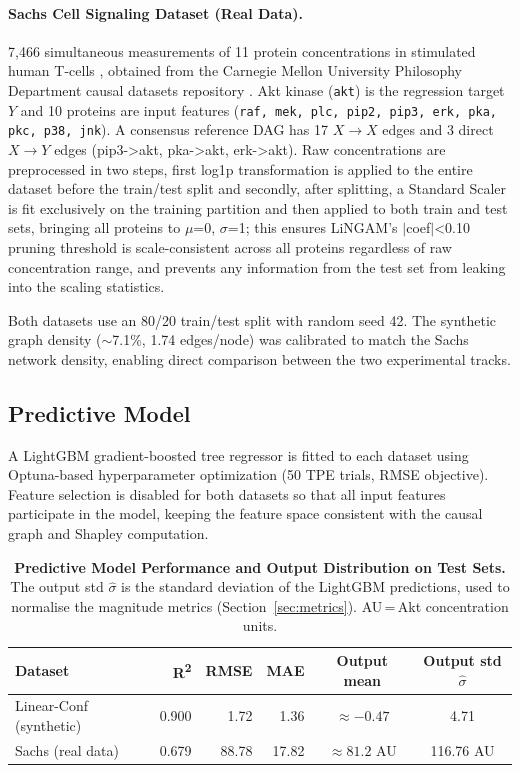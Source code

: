 \documentclass[12pt,a4paper,oneside]{article}
\begin{document}
\paragraph{Sachs Cell Signaling Dataset (Real Data).}
7,466 simultaneous measurements of 11 protein concentrations in stimulated human T-cells \citep{Sachs2005}, obtained from the Carnegie Mellon University Philosophy Department causal datasets repository \citep{Scheines2024}. Akt kinase (\texttt{akt}) is the regression target $Y$ and 10 proteins are input features (\texttt{raf, mek, plc, pip2, pip3, erk, pka, pkc, p38, jnk}). A consensus reference DAG has 17 $X \to X$ edges and 3 direct $X \to Y$ edges (pip3->akt, pka->akt, erk->akt). Raw concentrations are preprocessed in two steps, first log1p transformation is applied to the entire dataset before the train/test split and secondly, after splitting, a Standard Scaler is fit exclusively on the training partition and then applied to both train and test sets, bringing all proteins to $\mu$=0, $\sigma$=1; this ensures LiNGAM's $|$coef$|$<0.10 pruning threshold is scale-consistent across all proteins regardless of raw concentration range, and prevents any information from the test set from leaking into the scaling statistics.

Both datasets use an 80/20 train/test split with random seed 42. The synthetic graph density ($\sim$7.1\%, 1.74 edges/node) was calibrated to match the Sachs network density, enabling direct comparison between the two experimental tracks.

\subsection{Predictive Model}

A LightGBM gradient-boosted tree regressor is fitted to each dataset using Optuna-based hyperparameter optimization (50 TPE trials, RMSE objective). Feature selection is disabled for both datasets so that all input features participate in the model, keeping the feature space consistent with the causal graph and Shapley computation.

\begin{table}[H]
  \centering
  \small
  \caption{\textbf{Predictive Model Performance and Output Distribution on Test Sets.} The output std $\hat{\sigma}$ is the standard deviation of the LightGBM predictions, used to normalise the magnitude metrics (Section~\ref{sec:metrics}). AU\,=\,Akt concentration units.}
  \label{tab:model_performance}
  \begin{tabular}{lrrrcc}
    \toprule
    \textbf{Dataset} & \textbf{R\textsuperscript{2}} & \textbf{RMSE} & \textbf{MAE}
      & \textbf{Output mean} & \textbf{Output std $\hat{\sigma}$} \\
    \midrule
    Linear-Conf (synthetic) & 0.900 & 1.72 & 1.36 & $\approx{-0.47}$ & 4.71 \\
    Sachs (real data)        & 0.679 & 88.78 & 17.82 & $\approx 81.2$ AU & 116.76 AU \\
    \bottomrule
  \end{tabular}
\end{table}
\end{document}
